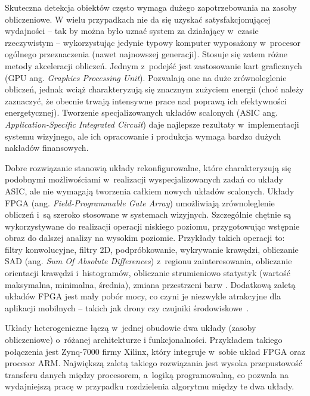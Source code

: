 Skuteczna detekcja obiektów często wymaga dużego zapotrzebowania na zasoby obliczeniowe.
W wielu przypadkach nie da się uzyskać satysfakcjonującej wydajności -- tak by można było uznać system za działający w~czasie rzeczywistym -- wykorzystując jedynie typowy komputer wyposażony w~procesor ogólnego przeznaczenia (nawet najnowszej generacji).
Stosuje się zatem różne metody akceleracji obliczeń.
Jednym z~podejść jest zastosowanie kart graficznych (GPU ang. \textit{Graphics Processing Unit}).
Pozwalają one na duże zrównoleglenie obliczeń, jednak wciąż charakteryzują się znacznym zużyciem energii (choć należy zaznaczyć, że obecnie trwają intensywne prace nad poprawą ich efektywności energetycznej). 
Tworzenie specjalizowanych układów scalonych (ASIC ang. \textit{Application-Specific Integrated Circuit}) daje najlepsze rezultaty w~implementacji systemu wizyjnego, ale ich opracowanie i produkcja wymaga bardzo dużych nakładów finansowych. 

Dobre rozwiązanie stanowią układy rekonfigurowalne, które charakteryzują się podobnymi możliwościami w~realizacji wyspecjalizowanych zadań co układy ASIC, ale nie wymagają tworzenia całkiem nowych układów scalonych. 
Układy FPGA (ang. \textit{Field-Programmable Gate Array}) umożliwiają zrównoleglenie obliczeń i~są szeroko stosowane w systemach wizyjnych.
Szczególnie chętnie są wykorzystywane do realizacji operacji niskiego poziomu, przygotowując wstępnie obraz do dalszej analizy na wysokim poziomie.
Przykłady takich operacji to: filtry konwolucyjne, filtry 2D, podpróbkowanie, wykrywanie krawędzi, obliczanie SAD (ang. \textit{Sum Of Absolute Differences}) z~regionu zainteresowania, obliczanie orientacji krawędzi i~histogramów, obliczanie strumieniowo statystyk (wartość maksymalna, minimalna, średnia), zmiana przestrzeni barw \cite{kisacanin2008embedded}. 
Dodatkową zaletą układów FPGA jest mały pobór mocy, co czyni je niezwykle atrakcyjne dla aplikacji mobilnych -- takich jak drony czy czujniki środowiskowe~\cite{garcia2014survey}.

Układy heterogeniczne łączą w~jednej obudowie dwa układy (zasoby obliczeniowe) o~różanej architekturze i funkcjonalności.
Przykładem takiego połączenia jest Zynq-7000 firmy Xilinx, który integruje w~sobie układ FPGA oraz procesor ARM.
Największą zaletą takiego rozwiązania jest wysoka przepustowość transferu danych między procesorem, a~logiką programowalną, co pozwala na wydajniejszą pracę w przypadku rozdzielenia algorytmu między te dwa układy.

